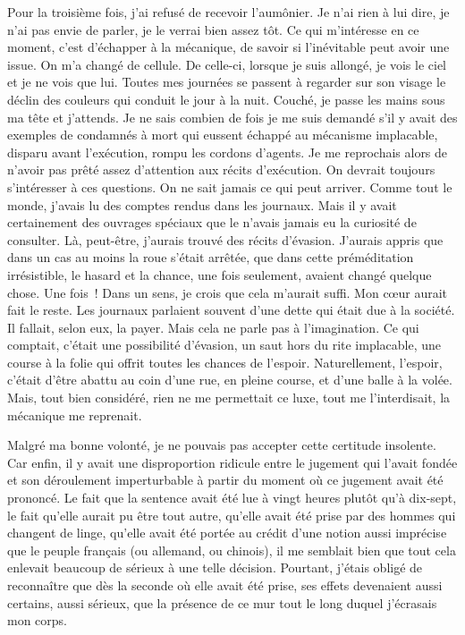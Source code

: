 \documentclass[french,twoside]{book} %
\newcommand\chaptercont{} %
\begin{document}
\chaptercont
\noindent Pour la troisième fois, j’ai refusé de recevoir l’aumônier. Je n’ai rien à lui dire, je n’ai pas envie de parler, je le verrai bien assez tôt. Ce qui m’intéresse en ce moment, c’est d’échapper à la mécanique, de savoir si l’inévitable peut avoir une issue. On m’a changé de cellule. De celle-ci, lorsque je suis allongé, je vois le ciel et je ne vois que lui. Toutes mes journées se passent à regarder sur son visage le déclin des couleurs qui conduit le jour à la nuit. Couché, je passe les mains sous ma tête et j’attends. Je ne sais combien de fois je me suis demandé s’il y avait des exemples de condamnés à mort qui eussent échappé au mécanisme implacable, disparu avant l’exécution, rompu les cordons d’agents. Je me reprochais alors de n’avoir pas prêté assez d’attention aux récits d’exécution. On devrait toujours s’intéresser à ces questions. On ne sait jamais ce qui peut arriver. Comme tout le monde, j’avais lu des comptes rendus dans les journaux. Mais il y avait certainement des ouvrages spéciaux que le n’avais jamais eu la curiosité de consulter. Là, peut-être, j’aurais trouvé des récits d’évasion. J'aurais appris que dans un cas au moins la roue s’était arrêtée, que dans cette préméditation irrésistible, le hasard et la chance, une fois seulement, avaient changé quelque chose. Une fois ! Dans un sens, je crois que cela m’aurait suffi. Mon cœur aurait fait le reste. Les journaux parlaient souvent d’une dette qui était due à la société. Il fallait, selon eux, la payer. Mais cela ne parle pas à l’imagination. Ce qui comptait, c’était une possibilité d’évasion, un saut hors du rite implacable, une course à la folie qui offrit toutes les chances de l’espoir. Naturellement, l’espoir, c’était d’être abattu au coin d’une rue, en pleine course, et d’une balle à la volée. Mais, tout bien considéré, rien ne me permettait ce luxe, tout me l’interdisait, la mécanique me reprenait.\par
Malgré ma bonne volonté, je ne pouvais pas accepter cette certitude insolente. Car enfin, il y avait une disproportion ridicule entre le jugement qui l’avait fondée et son déroulement imperturbable à partir du moment où ce jugement avait été prononcé. Le fait que la sentence avait été lue à vingt heures plutôt qu’à dix-sept, le fait qu’elle aurait pu être tout autre, qu’elle avait été prise par des hommes qui changent de linge, qu’elle avait été portée au crédit d’une notion aussi imprécise que le peuple français (ou allemand, ou chinois), il me semblait bien que tout cela enlevait beaucoup de sérieux à une telle décision. Pourtant, j’étais obligé de reconnaître que dès la seconde où elle avait été prise, ses effets devenaient aussi certains, aussi sérieux, que la présence de ce mur tout le long duquel j’écrasais mon corps.\par
\end{document}
